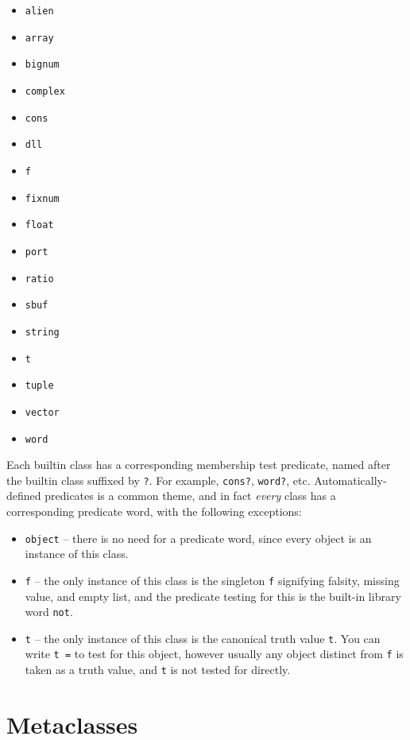 \documentclass[english]{book}
\begin{document}
\begin{itemize}
\item \texttt{alien}
\item \texttt{array}
\item \texttt{bignum}
\item \texttt{complex}
\item \texttt{cons}
\item \texttt{dll}
\item \texttt{f}
\item \texttt{fixnum}
\item \texttt{float}
\item \texttt{port}
\item \texttt{ratio}
\item \texttt{sbuf}
\item \texttt{string}
\item \texttt{t}
\item \texttt{tuple}
\item \texttt{vector}
\item \texttt{word}
\end{itemize}

Each builtin class has a corresponding membership test predicate, named
after the builtin class suffixed by \texttt{?}. For example, \texttt{cons?}, \texttt{word?}, etc. Automatically-defined predicates is a common theme, and
in fact \emph{every} class has a corresponding predicate word,
with the following
exceptions:

\begin{itemize}
\item \texttt{object} -- there is no need for a predicate word, since
every object is an instance of this class.
\item \texttt{f} -- the only instance of this class is the singleton
\texttt{f} signifying falsity, missing value, and empty list, and the predicate testing for this is the built-in library word \texttt{not}.
\item \texttt{t} -- the only instance of this class is the canonical truth value
\texttt{t}. You can write \texttt{t =} to test for this object, however usually
any object distinct from \texttt{f} is taken as a truth value, and \texttt{t} is not tested for directly.
\end{itemize}

\section{Metaclasses}
\end{document}
